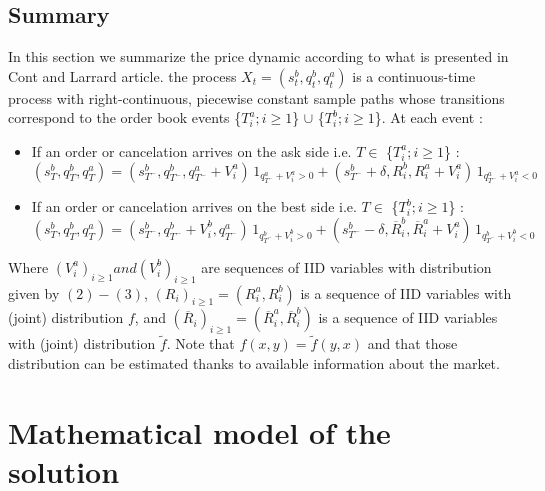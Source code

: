 \documentclass{article}
\begin{document}
\subsection{Summary}
In this section we summarize the price dynamic according to what is presented in Cont and Larrard article.
the process $X_{t} = (s_{t}^{b}, q_{t}^{b}, q_{t}^{a})$ is a continuous-time process with right-continuous, piecewise
constant sample paths whose transitions correspond to the order book events \{$T_i^{a} ; i \geq 1$\} $\cup$ \{$T_i^{b} ; i \geq 1$\}. At each event :
\begin{itemize}
\item If an order or cancelation arrives on the ask side i.e. $T \in $ \{$T_i^{a} ; i \geq 1$\} :
\begin{equation}
(s_{T}^{b}, q_{T}^{b}, q_{T}^{a}) = (s_{T^{-}}^{b}, q_{T^{-}}^{b}, q_{T^{-}}^{a}+V_i^{a}) \, 1_{q_{T^{-}}^{a}+V_i^{a}>0} + (s_{T^{-}}^{b}+ \delta, R_i^{b}, R_i^{a}+V_i^{a}) \, 1_{q_{T^{-}}^{a}+V_i^{a}<0}
\end{equation}

\item If an order or cancelation arrives on the best side i.e. $T \in $ \{$T_i^{b} ; i \geq 1$\} :
\begin{equation}
(s_{T}^{b}, q_{T}^{b}, q_{T}^{a}) = (s_{T^{-}}^{b}, q_{T^{-}}^{b}+V_i^{b}, q_{T^{-}}^{a}) \, 1_{q_{T^{-}}^{b}+V_i^{b}>0} + (s_{T^{-}}^{b}- \delta, \overline{R}_i^{b}, \overline{R}_i^{a}+V_i^{a}) \, 1_{q_{T^{-}}^{b}+V_i^{b}<0}
\end{equation}
\end{itemize}
Where $(V^{a}_i)_{i \geq 1} and (V^{b}_i)_{i \geq 1}$ are sequences of IID variables with distribution given by $(2)-(3)$, $(R_i)_{i \geq 1} = (R^{a}_i,R^{b}_i)$ is a sequence of IID variables with (joint) distribution $f$, and $(\overline{R}_i)_{i \geq 1} = (\overline{R}^{a}_i,\overline{R}^{b}_i)$ is a sequence of IID variables with (joint) distribution $\tilde{f}$.
Note that $f(x,y) = \tilde{f}(y,x)$ and that those distribution can be estimated thanks to available information about the market.




\newpage
\section{Mathematical model of the solution}
\end{document}
